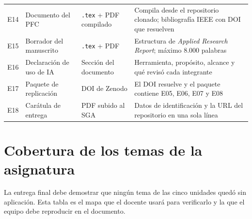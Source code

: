 \documentclass[11pt,a4paper]{article}
\begin{document}
\begin{center}
\begin{longtable}{@{}p{0.9cm}p{4.6cm}p{4.2cm}p{5.0cm}@{}}
		E14 & Documento del PFC & \texttt{.tex} + PDF compilado & Compila desde el repositorio clonado; bibliografía IEEE con DOI que resuelven \\
		E15 & Borrador del manuscrito & \texttt{.tex} + PDF & Estructura de \emph{Applied Research Report}; máximo 8.000 palabras \\
		E16 & Declaración de uso de IA & Sección del documento & Herramienta, propósito, alcance y qué revisó cada integrante \\
		E17 & Paquete de replicación & DOI de Zenodo & El DOI resuelve y el paquete contiene E05, E06, E07 y E08 \\
		E18 & Carátula de entrega & PDF subido al SGA & Datos de identificación y la URL del repositorio en una sola línea \\
		\bottomrule
	\end{longtable}
\end{center}

\section{Cobertura de los temas de la asignatura}

La entrega final debe demostrar que ningún tema de las cinco unidades quedó sin aplicación. Esta tabla es el mapa que el docente usará para verificarlo y la que el equipo debe reproducir en el documento.
\end{document}
